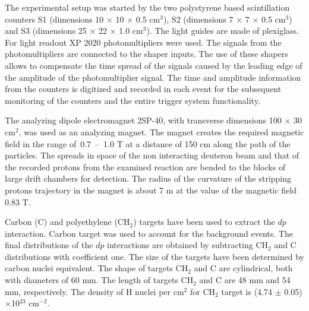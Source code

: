 \documentclass[twocolumn,epjc3]{svjour3}
\begin{document}
The experimental setup was started by the two polysty\-rene based scintillation
counters S1 (dimensions 10 $\times$ 10 $\times$ 0.5 cm$^3$), S2 (dimensions 7
$\times$ 7 $\times$ 0.5 cm$^3$) and S3 (dimensions 25 $\times$ 22 $\times$ 1.0
cm$^3$).
The light guides are made of plexiglass. For
light readout XP 2020 photomultipliers were used. The signals from the
photomultipliers are connected to the shaper inputs. The use of these shapers
allows to compensate the time spread of the signals caused by the leading edge
of the amplitude of the photomultiplier signal. The time and amplitude
information from the counters is digitized and recorded in each event for the
subsequent monitoring of the counters and the entire trigger system
functionality.

The analyzing dipole electromagnet 2SP-40, with transverse dimensions 100
$\times$ 30 cm$^2$, was used as an analyzing magnet. The magnet creates the
required magnetic field in the range of \,0.7~--~1.0 T at a distance of 150 cm
along the path of the particles. The spreads in space of the non interacting
deuteron beam and that of the recorded protons from the examined reaction are
bended to the blocks of large drift chambers for detection. The radius of the
curvature of the stripping protons trajectory in the magnet is about 7 m at the
value of the magnetic field 0.83 T.

Carbon (C) and polyethylene (CH$_2$) targets have been used to extract the $dp$
interaction. Carbon target was used to account for the background events. The
final distributions of the $dp$ interactions are obtained by subtracting CH$_2$
and C distributions with coefficient one. The size of the targets have been
determined by carbon nuclei equivalent. The shape of targets CH$_2$ and C are
cylindrical, both with diameters of 60 mm. The length of targets CH$_2$ and C
are 48 mm and 54 mm, respectively. The density of H nuclei per cm$^2$ for CH$_2$
target is (4.74 $\pm$ 0.05)$\times$10$^{23}$ cm$^{-2}$.
\end{document}
